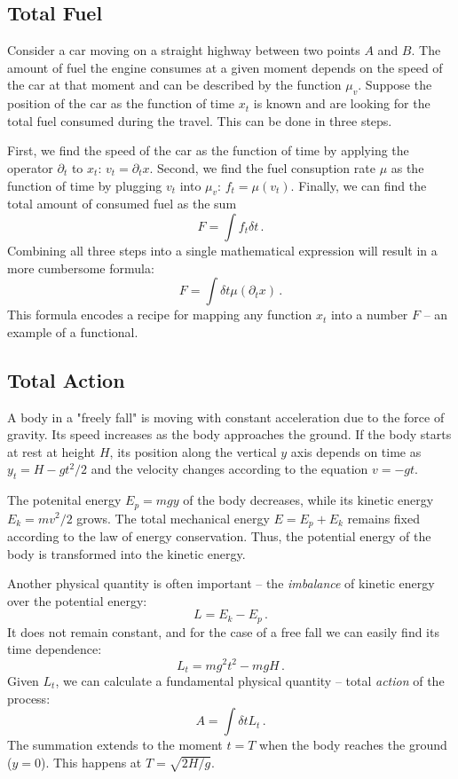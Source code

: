 \subsection*{Total Fuel}
Consider a car moving on a straight highway between two points $A$ and $B$. The amount of fuel the engine consumes at a given moment depends on the speed of the car at that moment and can be described by the function $\mu_v$. Suppose the position of the car as the function of time $x_t$ is known and are looking for the total fuel consumed during the travel. This can be done in three steps. 

First, we find the speed of the car as the function of time by applying the operator $\partial_t$ to $x_t$: $v_t=\partial_{t}x$. Second, we find the fuel consuption rate $\mu$  as the function of time by plugging $v_t$ into $\mu_v$: $f_t = \mu(v_t)$. Finally, we can find the total amount of consumed fuel as the sum
\[
F = \int f_t\delta t\,.
\]
Combining all three steps into a single mathematical expression will result in a more cumbersome formula:
\[
F = \int \delta t\mu(\partial_t x)\,.
\]
This formula encodes a recipe for mapping any function $x_t$ into a number $F$ -- an example of a functional.

\subsection*{Total Action}
A body in a "freely fall" is moving with constant acceleration due to the force of gravity. Its speed increases as the body approaches the ground. If the body starts at rest at height $H$, its position along the vertical $y$ axis depends on time as $y_t=H-gt^2/2$ and the velocity changes according to the equation $v=-gt$.

The potenital energy $E_p=mgy$ of the body decreases, while its kinetic energy $E_k=mv^2/2$ grows. The total mechanical energy $E=E_p+E_k$ remains fixed according to the law of energy conservation. Thus, the potential energy of the body is transformed into the kinetic energy.

Another physical quantity is often important -- the \emph{imbalance} of kinetic energy over the potential energy:
\[
L = E_k - E_p\,.
\]
It does not remain constant, and for the case of a free fall we can easily find its time dependence:
\[
L_t = mg^2t^2 - mgH\,.
\]
Given $L_t$, we can calculate a fundamental physical quantity -- total \emph{action} of the process:
\[
A = \int\delta t L_t\,.
\]
The summation extends to the moment $t=T$ when the body reaches the ground ($y=0$). This happens at $T=\sqrt{2H/g}$.

